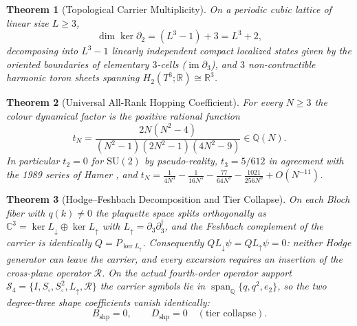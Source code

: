 \documentclass[11pt,a4paper]{article}
\newtheorem{theorem}{Theorem}[section]
\theoremstyle{definition}
\newcommand{\Q}{\mathbb{Q}}
\newcommand{\R}{\mathbb{R}}
\newcommand{\C}{\mathbb{C}}
\newcommand{\Ldn}{L_{\downarrow}}
\newcommand{\Lup}{L_{\uparrow}}
\newcommand{\Ssq}{S_{\square}}
\newcommand{\dg}{^{\dagger}}
\newcommand{\SU}{\mathrm{SU}}
\newcommand{\Rc}{\mathcal{R}}          %
\newcommand{\Bshp}{B_{\mathrm{shp}}}
\newcommand{\Dshp}{D_{\mathrm{shp}}}
\begin{document}
\begin{theorem}[Topological Carrier Multiplicity]\label{thm:intro_multiplicity}
On a periodic cubic lattice of linear size $L\ge 3$,
\begin{equation}\label{eq:intro_dim}
  \dim \ker \partial_2 = (L^3 - 1) + 3 = L^3 + 2,
\end{equation}
decomposing into $L^3-1$ linearly independent compact localized states given by the oriented boundaries of elementary $3$-cells ($\operatorname{im}\partial_3$), and $3$ non-contractible harmonic toron sheets spanning $H_2(T^3;\R)\cong\R^3$.
\end{theorem}

\begin{theorem}[Universal All-Rank Hopping Coefficient]\label{thm:intro_tN}
For every $N\ge 3$ the colour dynamical factor is the positive rational function
\begin{equation}\label{eq:intro_tN}
  t_N = \frac{2N(N^2-4)}{(N^2-1)(2N^2-1)(4N^2-9)} \in \Q(N).
\end{equation}
In particular $t_2 = 0$ for $\SU(2)$ by pseudo-reality, $t_3 = 5/612$ in agreement with the 1989 series of Hamer \cite{Hamer1989}, and $t_N = \tfrac{1}{4N^3} - \tfrac{1}{16N^5} - \tfrac{77}{64N^7} - \tfrac{1021}{256N^9} + O(N^{-11})$.
\end{theorem}

\begin{theorem}[Hodge--Feshbach Decomposition and Tier Collapse]\label{thm:intro_hodge}
On each Bloch fiber with $q(k) \ne 0$ the plaquette space splits orthogonally as $\C^3 = \ker\Ldn \oplus \ker\Lup$ with $\Lup = \partial_3\partial_3\dg$, and the Feshbach complement of the carrier is identically $Q = P_{\ker\Lup}$. Consequently $Q\Ldn\psi = Q\Lup\psi = 0$: neither Hodge generator can leave the carrier, and every excursion requires an insertion of the cross-plane operator $\Rc$. On the actual fourth-order operator support $\mathcal{S}_4 = \{I,\Ssq,\Ssq^2,\Lup,\Rc\}$ the carrier symbols lie in $\operatorname{span}_\Q\{q,q^2,e_2\}$, so the two degree-three shape coefficients vanish identically:
\begin{equation}
  \Bshp = 0, \qquad \Dshp = 0 \quad (\text{tier collapse}).
\end{equation}
\end{theorem}
\end{document}
